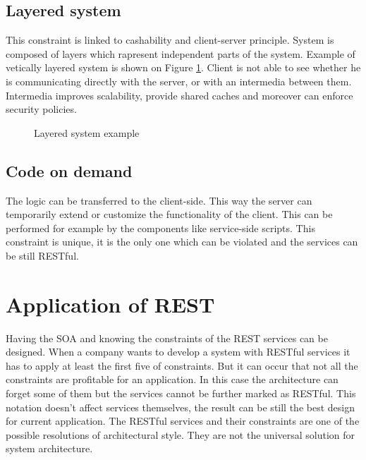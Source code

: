 \subsection{Layered system}

This constraint is linked to cashability and client-server principle. System is composed of layers which rapresent independent parts of the system. Example of vetically layered system is shown on Figure \ref{fig:layered-system}. Client is not able to see whether he is communicating directly with the server, or with an intermedia between them. Intermedia improves scalability, provide shared caches and moreover can enforce security policies.

\begin{figure}[htp] 
\caption{Layered system example}
\label{fig:layered-system}
\end{figure} 

\subsection{Code on demand}

The logic can be transferred to the client-side. This way the server can temporarily extend or customize the functionality of the client. This can be performed for example by the components like service-side scripts.
This constraint is unique, it is the only one which can be violated and the services can be still RESTful.

\section{Application of REST}

Having the SOA and knowing the constraints of the REST services can be designed. When a company wants to develop a system with RESTful services it has to apply at least the first five of constraints. But it can occur that not all the constraints are profitable for an application. In this case the architecture can forget some of them but the services cannot be further marked as RESTful. This notation doesn't affect services themselves, the result can be still the best design for current application. The RESTful services and their constraints are one of the possible resolutions of architectural style. They are not the universal solution for system architecture.


